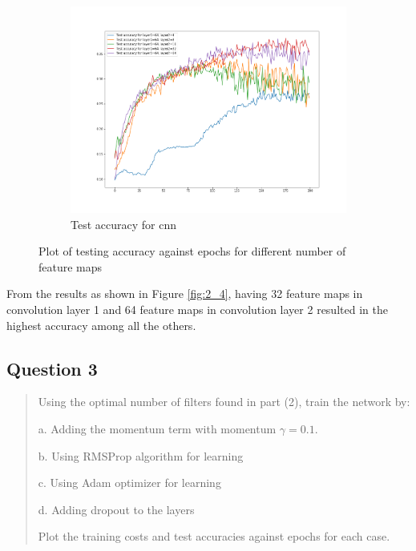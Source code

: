 \begin{figure}[H]
\begin{subfigure}{0.5\textwidth}
        \includegraphics[width=1\linewidth]{assets/plots1/q2_4.png}
        \caption{Test accuracy for cnn}
    \end{subfigure}
    \caption{Plot of testing accuracy against epochs for different number of feature maps}
    \label{fig:2}
\end{figure}

From the results as shown in Figure \ref{fig:2_4}, having 32 feature maps in convolution layer 1 and 64 feature maps in convolution layer 2 resulted in the highest accuracy among all the others.


\subsection{Question 3}
\label{1q3}
\begin{quote}
Using the optimal number of filters found in part (2), train the network by:

a. Adding the momentum term with momentum $\gamma = 0.1$.

b. Using RMSProp algorithm for learning

c. Using Adam optimizer for learning

d. Adding dropout to the layers

Plot the training costs and test accuracies against epochs for each case.
\end{quote}

